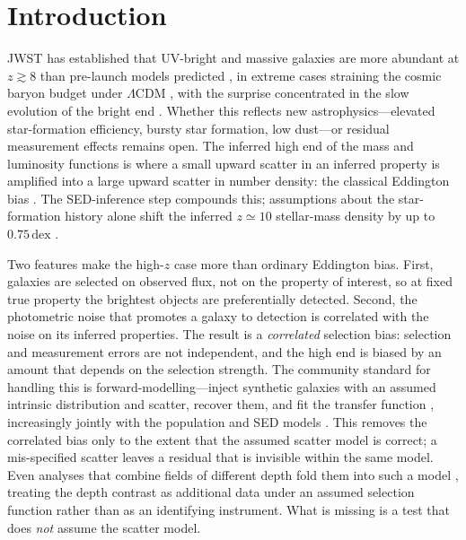\documentclass{aa}
\newcommand{\dex}{\,\mathrm{dex}}
\begin{document}
\section{Introduction}
\label{sec:intro}

JWST has established that UV-bright and massive galaxies are more abundant at $z\gtrsim8$ than
pre-launch models predicted \citep{Finkelstein2023,Labbe2023,Harikane2023,Donnan2023}, in extreme
cases straining the cosmic baryon budget under $\Lambda$CDM \citep{BoylanKolchin2023}, with the
surprise concentrated in the slow evolution of the bright end \citep{Finkelstein2024}. Whether
this reflects new astrophysics---elevated star-formation efficiency, bursty star formation, low
dust---or residual measurement effects remains open. The inferred high end of the mass and
luminosity functions is where a small upward scatter in an inferred property is amplified into a
large upward scatter in number density: the classical Eddington bias \citep{Eddington1913}. The
SED-inference step compounds this; assumptions about the star-formation history alone shift the
inferred $z\simeq10$ stellar-mass density by up to $0.75\dex$ \citep{Harvey2025}.

Two features make the high-$z$ case more than ordinary Eddington bias. First, galaxies are
selected on observed flux, not on the property of interest, so at fixed true property the
brightest objects are preferentially detected. Second, the photometric noise that promotes a
galaxy to detection is correlated with the noise on its inferred properties. The result is a
\emph{correlated} selection bias: selection and measurement errors are not independent, and the
high end is biased by an amount that depends on the selection strength. The community standard for
handling this is forward-modelling---inject synthetic galaxies with an assumed intrinsic
distribution and scatter, recover them, and fit the transfer function
\citep{Weaver2023,Davidzon2017}, increasingly jointly with the population and SED models
\citep{Leistedt2016,Alsing2024}. This removes the correlated bias only to the extent that the
assumed scatter model is correct; a mis-specified scatter leaves a residual that is invisible
within the same model. Even analyses that combine fields of different depth fold them into such a
model \citep{Tornotti2025}, treating the depth contrast as additional data under an assumed
selection function rather than as an identifying instrument. What is missing is a
test that does \emph{not} assume the scatter model.
\end{document}
